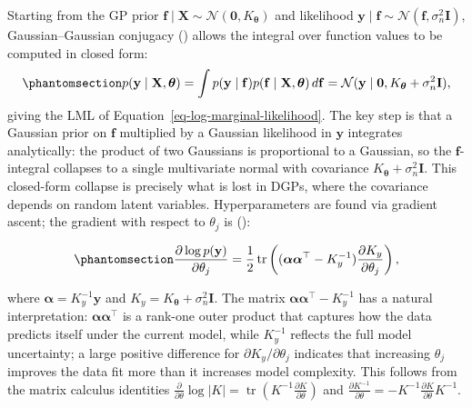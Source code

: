 \documentclass[
  letterpaper,
  DIV=11,
  numbers=noendperiod]{scrartcl}
\begin{document}
Starting from the GP prior
\(\mathbf{f} \mid \mathbf{X} \sim \mathcal{N}(\mathbf{0}, K_{\boldsymbol{\theta}})\)
and likelihood
\(\mathbf{y} \mid \mathbf{f} \sim \mathcal{N}(\mathbf{f}, \sigma_n^2 \mathbf{I})\),
Gaussian--Gaussian conjugacy
() allows
the integral over function values to be computed in closed form:
\begin{equation}\phantomsection\label{eq-gp_marginal_likelihood}{
p(\mathbf{y} \mid \mathbf{X}, \boldsymbol{\theta}) = \int p(\mathbf{y} \mid \mathbf{f}) p(\mathbf{f} \mid \mathbf{X}, \boldsymbol{\theta}) \, d\mathbf{f} = \mathcal{N}(\mathbf{y} \mid \mathbf{0}, K_{\boldsymbol{\theta}} + \sigma_n^2 \mathbf{I}),
}\end{equation} giving the LML of
Equation~\ref{eq-log-marginal-likelihood}. The key step is that a
Gaussian prior on \(\mathbf{f}\) multiplied by a Gaussian likelihood in
\(\mathbf{y}\) integrates analytically: the product of two Gaussians is
proportional to a Gaussian, so the \(\mathbf{f}\)-integral collapses to
a single multivariate normal with covariance
\(K_{\boldsymbol{\theta}} + \sigma_n^2 \mathbf{I}\). This closed-form
collapse is precisely what is lost in DGPs, where the covariance depends
on random latent variables. Hyperparameters are found via gradient
ascent; the gradient with respect to \(\theta_j\) is
():

\begin{equation}\phantomsection\label{eq-gradient}{
\frac{\partial \log p(\mathbf{y})}{\partial \theta_j} = \frac{1}{2}\operatorname{tr}\left((\boldsymbol{\alpha} \boldsymbol{\alpha}^\top - K_y^{-1}) \frac{\partial K_y}{\partial \theta_j}\right),
}\end{equation}

where \(\boldsymbol{\alpha} = K_y^{-1} \mathbf{y}\) and
\(K_y = K_{\boldsymbol{\theta}} + \sigma_n^2 \mathbf{I}\). The matrix
\(\boldsymbol{\alpha} \boldsymbol{\alpha}^\top - K_y^{-1}\) has a
natural interpretation: \(\boldsymbol{\alpha} \boldsymbol{\alpha}^\top\)
is a rank-one outer product that captures how the data predicts itself
under the current model, while \(K_y^{-1}\) reflects the full model
uncertainty; a large positive difference for
\(\partial K_y / \partial \theta_j\) indicates that increasing
\(\theta_j\) improves the data fit more than it increases model
complexity. This follows from the matrix calculus identities
\(\frac{\partial}{\partial \theta} \log|K| = \operatorname{tr}(K^{-1} \frac{\partial K}{\partial \theta})\)
and
\(\frac{\partial K^{-1}}{\partial \theta} = -K^{-1} \frac{\partial K}{\partial \theta} K^{-1}\).
\end{document}
